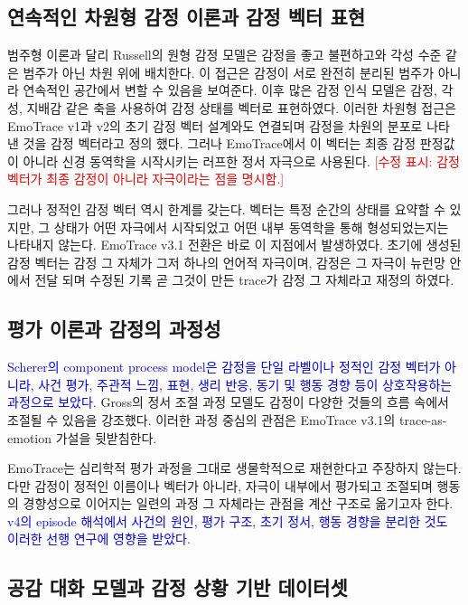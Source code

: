 ﻿\documentclass[11pt,a4paper]{article}
\begin{document}
\subsection{연속적인 차원형 감정 이론과 감정 벡터 표현}

범주형 이론과 달리 Russell의 원형 감정 모델은 감정을 좋고 불편하고와 각성 수준 같은 범주가 아닌 차원 위에 배치한다\cite{russell1980}. 이 접근은 감정이 서로 완전히 분리된 범주가 아니라 연속적인 공간에서 변할 수 있음을 보여준다. 이후 많은 감정 인식 모델은 감정, 각성, 지배감 같은 축을 사용하여 감정 상태를 벡터로 표현하였다. 이러한 차원형 접근은 EmoTrace v1과 v2의 초기 감정 벡터 설계와도 연결되며 감정을 차원의 분포로 나타 낸 것을 감정 벡터라고 정의 했다. 그러나 EmoTrace에서 이 벡터는 최종 감정 판정값이 아니라 신경 동역학을 시작시키는 러프한 정서 자극으로 사용된다. \textcolor{red}{[수정 표시: 감정 벡터가 최종 감정이 아니라 자극이라는 점을 명시함.]}

그러나 정적인 감정 벡터 역시 한계를 갖는다. 벡터는 특정 순간의 상태를 요약할 수 있지만, 그 상태가 어떤 자극에서 시작되었고 어떤 내부 동역학을 통해 형성되었는지는 나타내지 않는다. EmoTrace v3.1 전환은 바로 이 지점에서 발생하였다. 초기에 생성된 감정 벡터는 감정 그 자체가 그저 하나의 언어적 자극이며, 감정은 그 자극이 뉴런망 안에서 전달 되며 수정된 기록 곧 그것이 만든 trace가 감정 그 자체라고 재정의 하였다.

\subsection{평가 이론과 감정의 과정성}

\textcolor{blue}{Scherer의 component process model은 감정을 단일 라벨이나 정적인 감정 벡터가 아니라, 사건 평가, 주관적 느낌, 표현, 생리 반응, 동기 및 행동 경향 등이 상호작용하는 과정으로 보았다\cite{scherer2009}.} Gross의 정서 조절 과정 모델도 감정이 다양한 것들의 흐름 속에서 조절될 수 있음을 강조했다\cite{gross1998}. 이러한 과정 중심의 관점은 EmoTrace v3.1의 trace-as-emotion 가설을 뒷받침한다.

EmoTrace는 심리학적 평가 과정을 그대로 생물학적으로 재현한다고 주장하지 않는다. 다만 감정이 정적인 이름이나 벡터가 아니라, 자극이 내부에서 평가되고 조절되며 행동의 경향성으로 이어지는 일련의 과정 그 자체라는 관점을 계산 구조로 옮기고자 한다. \textcolor{blue}{v4의 episode 해석에서 사건의 원인, 평가 구조, 초기 정서, 행동 경향을 분리한 것도 이러한 선행 연구에 영향을 받았다.}

\subsection{공감 대화 모델과 감정 상황 기반 데이터셋}
\end{document}
